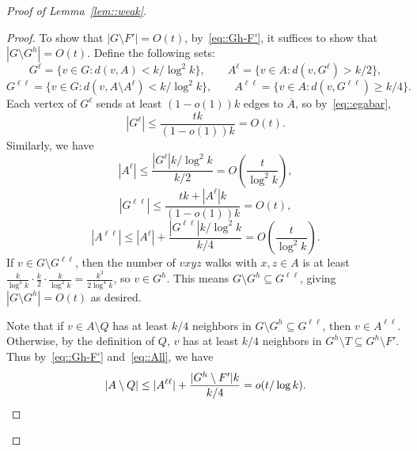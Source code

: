 \documentclass[12pt]{article}
\renewcommand{\bar}[1]{\overline{#1}}
\begin{document}
\begin{proof}[Proof of Lemma~\ref{lem::weak}]
\begin{proof}
To show that $|G \setminus F'| = O(t)$, by~\eqref{eq::Gh-F'}, it suffices to show that $|G \setminus G^h| = O(t)$. Define the following sets:
\[ G^\ell = \{ v \in G : d(v,A) < k/\log^2 k \}, \quad \quad A^\ell = \{ v \in A : d(v,G^\ell) > k/2 \} ,\]
\[ G^{\ell\ell} = \{ v \in G : d(v,A\setminus A^\ell) < k/\log^2 k \}, \quad \quad A^{\ell\ell} = \{ v \in A : d(v,G^{\ell\ell}) \geq k/4 \} .\]
Each vertex of $G^\ell$ sends at least $(1-o(1))k$ edges to $\bar{A}$, so by~\eqref{eq::egabar},
\[ |G^\ell| \leq \frac{tk}{(1-o(1))k} = O(t) .\]
Similarly, we have
\[ |A^\ell| \leq \frac{|G^\ell|k/\log^2 k}{k/2} = O\left(\frac{t}{\log^2 k}\right) ,\]
\[ |G^{\ell\ell}| \leq \frac{tk+|A^\ell|k}{(1-o(1))k} = O(t) ,\]
\begin{equation}\label{eq::All}
|A^{\ell\ell}| \leq |A^\ell| + \frac{|G^{\ell\ell}|k/\log^2 k}{k/4} = O\left(\frac{t}{\log^2 k}\right) .
\end{equation}
If $v \in G \setminus G^{\ell\ell}$, then the number of $vxyz$ walks with $x,z \in A$ is at least $\frac{k}{\log^2 k} \cdot \frac{k}{2} \cdot \frac{k}{\log^2 k} = \frac{k^3}{2\log^4 k}$, so $v \in G^h$. This means $G \setminus G^h \subseteq G^{\ell\ell}$, giving $|G \setminus G^h| = O(t)$ as desired.

Note that if $v \in A \setminus Q$ has at least $k/4$ neighbors in $G \setminus G^h \subseteq G^{\ell\ell}$, then $v \in A^{\ell\ell}$. Otherwise, by the definition of $Q$, $v$ has at least $k/4$ neighbors in $G^h \setminus T \subseteq G^h \setminus F'$. Thus by~\eqref{eq::Gh-F'} and~\eqref{eq::All}, we have
\[ |A \setminus Q| \leq |A^{\ell\ell}| + \frac{|G^h \setminus F'|k}{k/4} = o(t/\log k) . \qedhere\]
\end{proof}


\end{proof}
\end{document}
